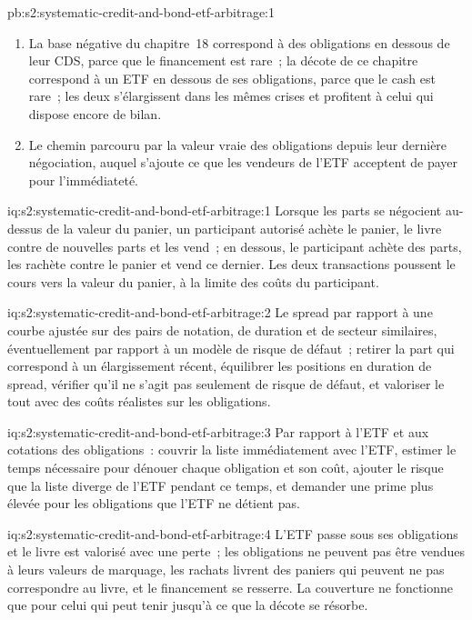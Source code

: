 \begin{solution}{pb:s2:systematic-credit-and-bond-etf-arbitrage:1}
\begin{enumerate}
\item La base négative du chapitre~18 correspond à des obligations en dessous de leur CDS, parce que le financement est rare~; la décote de ce chapitre correspond à un ETF en dessous de ses obligations, parce que le cash est rare~; les
deux s'élargissent dans les mêmes crises et profitent à celui qui dispose encore de bilan.
\item Le chemin parcouru par la valeur vraie des obligations depuis leur dernière négociation, auquel s'ajoute ce que les vendeurs de l'ETF acceptent de payer pour l'immédiateté.
\end{enumerate}
\end{solution}

\begin{solution}{iq:s2:systematic-credit-and-bond-etf-arbitrage:1}
Lorsque les parts se négocient au-dessus de la valeur du panier, un participant autorisé achète le panier, le livre contre de nouvelles parts et les vend~; en dessous, le
participant achète des parts, les rachète contre le panier et vend ce dernier. Les deux transactions poussent le cours vers la valeur du panier, à la
limite des coûts du participant.
\end{solution}

\begin{solution}{iq:s2:systematic-credit-and-bond-etf-arbitrage:2}
Le spread par rapport à une courbe ajustée sur des pairs de notation, de duration et de secteur similaires, éventuellement par rapport à un modèle de risque de défaut~; retirer la part qui correspond à un
élargissement récent, équilibrer les positions en duration de spread, vérifier qu'il ne s'agit pas seulement de risque de défaut, et valoriser le tout avec des coûts réalistes sur les obligations.
\end{solution}

\begin{solution}{iq:s2:systematic-credit-and-bond-etf-arbitrage:3}
Par rapport à l'ETF et aux cotations des obligations~: couvrir la liste immédiatement avec l'ETF, estimer le temps nécessaire pour dénouer chaque obligation et son coût, ajouter
le risque que la liste diverge de l'ETF pendant ce temps, et demander une prime plus élevée pour les obligations que l'ETF ne détient pas.
\end{solution}

\begin{solution}{iq:s2:systematic-credit-and-bond-etf-arbitrage:4}
L'ETF passe sous ses obligations et le livre est valorisé avec une perte~; les obligations ne peuvent pas être vendues à leurs valeurs de marquage, les rachats livrent des paniers qui peuvent ne pas
correspondre au livre, et le financement se resserre. La couverture ne fonctionne que pour celui qui peut tenir jusqu'à ce que la décote se résorbe.
\end{solution}

